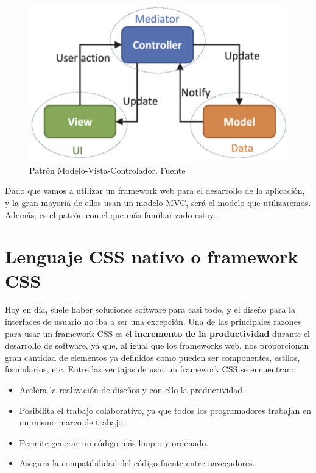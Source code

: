     \begin{figure}[H]
        \centering
        \includegraphics[scale=0.50]{imagenes/mvc.png}
        \caption[Patrón Modelo-Vista-Controlador]{Patrón Modelo-Vista-Controlador. Fuente \cite{mvc}}
        \label{fig:mvc}
    \end{figure}

Dado que vamos a utilizar un framework web para el desarrollo de la aplicación, y la gran
mayoría de ellos usan un modelo MVC, será el modelo que utilizaremos. Además, es el
patrón con el que más familiarizado estoy.

\section{Lenguaje CSS nativo o framework CSS} \label{sec:css-frameworkcss}
Hoy en día, suele haber soluciones software para casi todo, y el diseño para la interfaces
de usuario no iba a ser una excepción. Una de las principales razones para usar un framework
CSS es el \textbf{incremento de la productividad} durante el desarrollo de software, ya que,
al igual que los frameworks web, nos proporcionan gran cantidad de elementos ya definidos
como pueden ser componentes, estilos, formularios, etc. Entre las ventajas de usar un
framework CSS se encuentran:

    \begin{itemize}
        \item Acelera la realización de diseños y con ello la productividad.
        \item Posibilita el trabajo colaborativo, ya que todos los programadores
        trabajan en un mismo marco de trabajo.
        \item Permite generar un código más limpio y ordenado.
        \item Asegura la compatibilidad del código fuente entre navegadores.
    \end{itemize}

